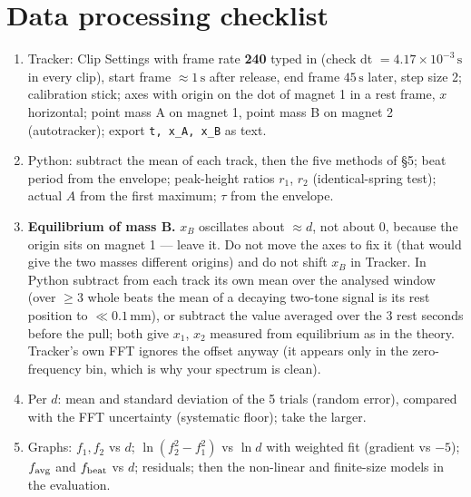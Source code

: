 \documentclass[11pt,a4paper]{article}
\newcommand{\un}[1]{\,\mathrm{#1}}
\begin{document}
\section{Data processing checklist}

\begin{enumerate}[leftmargin=1.6em,itemsep=1pt]
\item Tracker: Clip Settings with frame rate \textbf{240} typed in (check dt $=4.17\times10^{-3}\un{s}$ in every clip), start frame $\approx1\un{s}$ after release, end frame $45\un{s}$ later, step size 2; calibration stick; axes with origin on the dot of magnet 1 in a rest frame, $x$ horizontal; point mass A on magnet 1, point mass B on magnet 2 (autotracker); export \texttt{t, x\_A, x\_B} as text.
\item Python: subtract the mean of each track, then the five methods of \S5; beat period from the envelope; peak-height ratios $r_1$, $r_2$ (identical-spring test); actual $A$ from the first maximum; $\tau$ from the envelope.
\item \textbf{Equilibrium of mass B.} $x_B$ oscillates about $\approx d$, not about 0, because the origin sits on magnet 1 --- leave it. Do not move the axes to fix it (that would give the two masses different origins) and do not shift $x_B$ in Tracker. In Python subtract from each track its own mean over the analysed window (over $\ge3$ whole beats the mean of a decaying two-tone signal is its rest position to $\ll0.1\un{mm}$), or subtract the value averaged over the 3 rest seconds before the pull; both give $x_1$, $x_2$ measured from equilibrium as in the theory. Tracker's own FFT ignores the offset anyway (it appears only in the zero-frequency bin, which is why your spectrum is clean).
\item Per $d$: mean and standard deviation of the 5 trials (random error), compared with the FFT uncertainty (systematic floor); take the larger.
\item Graphs: $f_1,f_2$ vs $d$; $\ln(f_2^2-f_1^2)$ vs $\ln d$ with weighted fit (gradient vs $-5$); $f_{\rm avg}$ and $f_{\rm beat}$ vs $d$; residuals; then the non-linear and finite-size models in the evaluation.
\end{enumerate}

\end{document}
